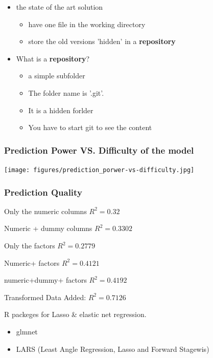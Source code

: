 \documentclass{beamer}
\begin{document}
\begin{frame}

\begin{itemize}
\item the state of the art solution
\begin{itemize}
\item  have one file in the working directory
\item store the old versions 'hidden' in a \textbf{repository}
\end{itemize}
\pause
\item What is a \textbf{repository}?
\begin{itemize}
\item  a simple subfolder 
\item The folder name is '.git'.
\item It is a hidden forlder
\item You have to start git to see the content
 
\end{itemize}


\end{itemize}

\end{frame}




\begin{frame}
\frametitle<presentation>{Prediction Power VS. Difficulty of the model}
\texttt{[image: figures/prediction\_porwer-vs-difficulty.jpg]}
\end{frame}



\begin{frame}
\frametitle<presentation>{Prediction Quality}


Only the numeric columns $R^2 =0.32$

Numeric + dummy columns $R^2 =0.3302$

Only the factors $R^2 =0.2779$

Numeric+ factors $R^2 =0.4121$

numeric+dummy+ factors $R^2 =0.4192$

Transformed Data Added: $R^2 = 0.7126$

\end{frame}


\begin{frame}

R packeges for Lasso \& elastic net regression.
\begin{itemize}

\item glmnet

\item LARS (Least Angle Regression, Lasso and Forward Stagewis)
\end{itemize}

\end{frame}
\end{document}
